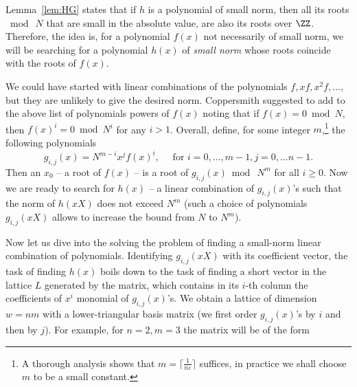 \documentclass[11pt]{exam}
\theoremstyle{definition}
\begin{document}
Lemma~\ref{lem:HG} states that if $h$ is a polynomial of small norm, then all its roots $\bmod~N$ that are small in the absolute value, are also its roots over $\ZZ$. Therefore, the idea is, for a polynomial $f(x)$ not necessarily of small norm, we will be searching for a polynomial $h(x)$ of \emph{small norm} whose roots coincide with the roots of $f(x)$. 

We could have started with linear combinations of the polynomials  $f, xf, x^2f, \ldots$, but they are unlikely to give the desired norm. Coppersmith suggested to add to the above list of polynomials powers of $f(x)$ noting that if $f(x) = 0 \bmod N$, then $f(x)^i = 0 \bmod N^i$ for any $i > 1$. Overall, define, for some integer $m$,\footnote{A thorough analysis shows that $m = \lceil \frac{1}{n\varepsilon} \rceil$ suffices, in practice we shall choose $m$ to be a small constant.} the following polynomials
\[
		g_{i,j}(x) = N^{m-i}x^jf(x)^i, \quad \text{ for } i = 0, \ldots, m-1, j = 0, \ldots n-1.
	\]
Then an $x_0$ -- a root of $f(x)$ -- is a root of  $g_{i,j}(x) \bmod~N^m$ for all $i \geq 0$. Now we are ready to search for $h(x)$ -- a linear combination of $g_{i,j}(x)$'s such that the norm of $h(xX)$  does not exceed $N^m$ (such a choice of polynomials $g_{i,j}(xX)$ allows to increase the bound from $N$ to $N^m$).


Now let us dive into the solving the problem of finding a small-norm linear combination of polynomials. Identifying $g_{i,j}(xX)$ with its coefficient vector, the task of finding $h(x)$ boils down to the task of finding a short vector in the lattice $L$ generated by the matrix, which contains in its $i$-th column the coefficients of $x^i$ monomial of $g_{i,j}(x)$'s. We obtain a lattice of dimension  $w = nm$ with a lower-triangular basis matrix (we first order $g_{i,j}(x)$'s by $i$ and then by $j$). For example, for $n=2, m=3$ the matrix will be of the form
	
\end{document}
